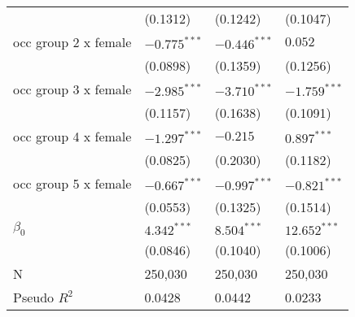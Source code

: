 \begin{tabular}{llll}
                                       &           (0.1312) &           (0.1242) &           (0.1047) \\
occ group 2 x female                   &     $-0.775^{***}$ &     $-0.446^{***}$ &            $0.052$ \\
                                       &           (0.0898) &           (0.1359) &           (0.1256) \\
occ group 3 x female                   &     $-2.985^{***}$ &     $-3.710^{***}$ &     $-1.759^{***}$ \\
                                       &           (0.1157) &           (0.1638) &           (0.1091) \\
occ group 4 x female                   &     $-1.297^{***}$ &           $-0.215$ &      $0.897^{***}$ \\
                                       &           (0.0825) &           (0.2030) &           (0.1182) \\
occ group 5 x female                   &     $-0.667^{***}$ &     $-0.997^{***}$ &     $-0.821^{***}$ \\
                                       &           (0.0553) &           (0.1325) &           (0.1514) \\
$\beta_0$                              &      $4.342^{***}$ &      $8.504^{***}$ &     $12.652^{***}$ \\
                                       &           (0.0846) &           (0.1040) &           (0.1006) \\
\midrule
N                                      &            250,030 &            250,030 &            250,030 \\
Pseudo $R^2$                           &             0.0428 &             0.0442 &             0.0233 \\
\bottomrule
\end{tabular}

